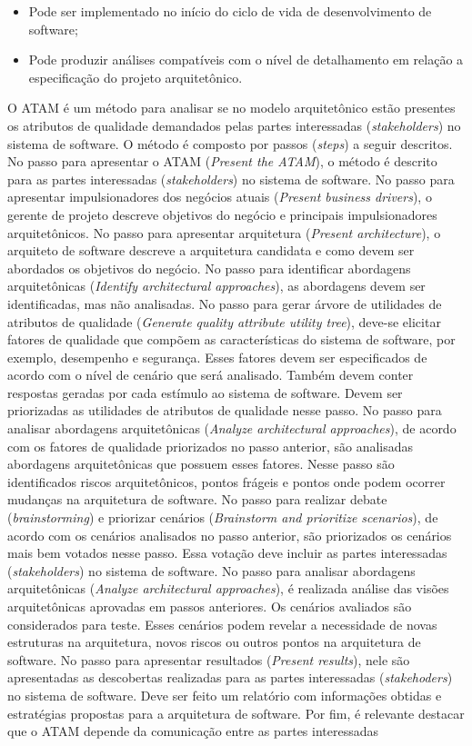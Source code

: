 \begin{itemize}
    \item Pode ser implementado no início do ciclo de vida de desenvolvimento de software;
    \item Pode produzir análises compatíveis com o nível de detalhamento em relação a especificação do projeto arquitetônico.  
\end{itemize}

O ATAM é um método para analisar se no modelo arquitetônico estão presentes os atributos de qualidade demandados pelas partes interessadas (\emph{stakeholders}) no sistema de software. O método é composto por passos (\emph{steps}) a seguir descritos. No passo para apresentar o ATAM (\emph{Present the ATAM}), o método é descrito para as partes interessadas (\emph{stakeholders}) no sistema de software. No passo para apresentar impulsionadores dos negócios atuais (\emph{Present business drivers}), o gerente de projeto descreve objetivos do negócio e principais impulsionadores arquitetônicos. No passo para apresentar arquitetura (\emph{Present architecture}), o arquiteto de software descreve a arquitetura candidata e como devem ser abordados os objetivos do negócio. No passo para identificar abordagens arquitetônicas (\emph{Identify architectural approaches}), as abordagens devem ser identificadas, mas não analisadas. No passo para gerar árvore de utilidades de atributos de qualidade (\emph{Generate quality attribute utility tree}), deve-se elicitar fatores de qualidade que compõem as características do sistema de software, por exemplo, desempenho e segurança. Esses fatores devem ser especificados de acordo com o nível de cenário que será analisado. Também devem conter respostas geradas por cada estímulo ao sistema de software. Devem ser priorizadas as utilidades de atributos de qualidade nesse passo. No passo para analisar abordagens arquitetônicas (\emph{Analyze architectural approaches}), de acordo com os fatores de qualidade priorizados no passo anterior, são analisadas abordagens arquitetônicas que possuem esses fatores. Nesse passo são identificados riscos arquitetônicos, pontos frágeis e pontos onde podem ocorrer mudanças na arquitetura de software. No passo para realizar debate (\emph{brainstorming}) e priorizar cenários (\emph{Brainstorm and prioritize scenarios}), de acordo com os cenários analisados no passo anterior, são priorizados os cenários mais bem votados nesse passo. Essa votação deve incluir as partes interessadas (\emph{stakeholders}) no sistema de software. No passo para analisar abordagens arquitetônicas (\emph{Analyze architectural approaches}), é realizada análise das visões arquitetônicas aprovadas em passos anteriores. Os cenários avaliados são considerados para teste. Esses cenários podem revelar a necessidade de novas estruturas na arquitetura, novos riscos ou outros pontos na arquitetura de software. No passo para apresentar resultados (\emph{Present results}), nele são apresentadas as descobertas realizadas para as partes interessadas (\emph{stakehoders}) no sistema de software. Deve ser feito um relatório com informações obtidas e estratégias propostas para a arquitetura de software. Por fim, é relevante destacar que o ATAM depende da comunicação entre as partes interessadas 
